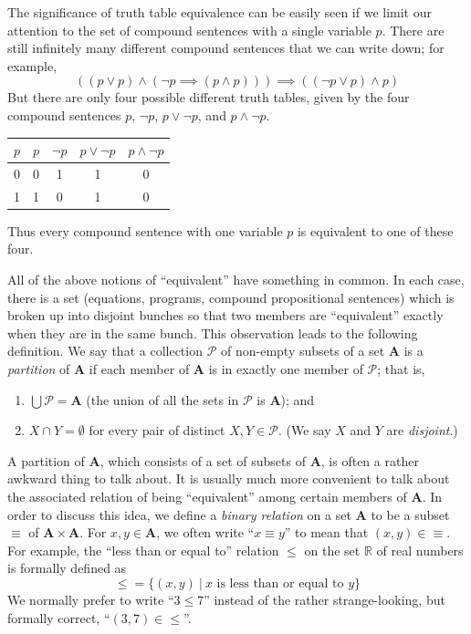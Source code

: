 \documentclass{article}
\newcommand\Pc{\mathcal P}
\newcommand\A{\mathbf A}
\newcommand{\0}{\mathbf 0}
\newcommand{\1}{\mathbf 1}
\newcommand\R{\mathbb R}
\begin{document}
The significance of truth table equivalence can be easily seen if we limit our attention to the set of compound sentences with a single variable $p$. There are still infinitely many different compound sentences that we can write down; for example,
\begin{equation*}
( (p \lor p) \land (\lnot p \implies (p \land p)) ) \implies ( (\lnot p \lor p) \land p )
\end{equation*}
But there are only four possible different truth tables, given by the four compound sentences $p$, $\lnot p$, $p \lor \lnot p$, and $p \land \lnot p$.
\begin{center}
\begin{tabular}{||c||c|c|c|c||}
  \hline
  $p$ & $p$ & $\lnot p$ & $p \lor \lnot p$ & $p \land \lnot p$ \\
  \hline
  0 & 0 & 1 & 1 & 0 \\ 
  \hline
  1 & 1 & 0 & 1 & 0 \\ 
  \hline
\end{tabular}
\end{center}

Thus every compound sentence with one variable $p$ is equivalent to one of these four.

All of the above notions of ``equivalent'' have something in common. In each case, there is a set (equations, programs, compound propositional sentences) which is broken up into disjoint bunches so that two members are ``equivalent'' exactly when they are in the same bunch. This observation leads to the following definition. We say that a collection $\Pc$ of non-empty subsets of a set $\A$ is a \emph{partition} of $\A$ if each member of $\A$ is in exactly one member of $\Pc$; that is,
\begin{enumerate}[\hspace{1cm}(1.)]
  \item $\bigcup \Pc = \A$ (the union of all the sets in $\Pc$ is $\A$); and
  \item $X \cap Y = \emptyset$ for every pair of distinct $X, Y \in \Pc$. (We say $X$ and $Y$ are \emph{disjoint}.)
\end{enumerate}

A partition of $\A$, which consists of a set of subsets of $\A$, is often a rather awkward thing to talk about. It is usually much more convenient to talk about the associated relation of being ``equivalent'' among certain members of $\A$. In order to discuss this idea, we define a \emph{binary relation} on a set $\A$ to be a subset $\equiv$ of $\A \times \A$. For $x,y \in \A$, we often write ``$x \equiv y$'' to mean that $(x,y) \in \equiv$. For example, the ``less than or equal to'' relation $\leq$ on the set $\R$ of real numbers is formally defined as
\begin{equation*}
\leq = \{ (x,y)\ |\ x \text{ is less than or equal to } y \}
\end{equation*}
We normally prefer to write ``$3 \leq 7$'' instead of the rather strange-looking, but formally correct, ``$(3,7) \in \leq$''.
\end{document}
